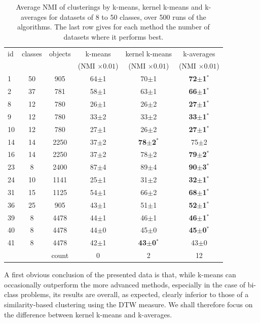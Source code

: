 \documentclass[a4paper,twoside]{article}
\begin{document}
 
 
   
\begin{table} 
\begin{center} 
\small 
 \setlength{\tabcolsep}{1em}
 \renewcommand{\arraystretch}{1.2}
\begin{tabular}{lccccc} 
id & classes & objects & k-means & kernel k-means & k-averages \\ 
&  &  & (NMI $\times 0.01$) & (NMI $\times 0.01$) & (NMI $\times 0.01$) \\ 
\hline 
 1 & 50 &  905 & 64$\pm$1 & 70$\pm$1 & \textbf{72$\pm$1$^*$} \\ 
 2 & 37 &  781 & 58$\pm$1 & 63$\pm$1 & \textbf{66$\pm$1$^*$} \\ 
 8 & 12 &  780 & 26$\pm$1 & 26$\pm$2 & \textbf{27$\pm$1$^*$} \\ 
 9 & 12 &  780 & 33$\pm$2 & 33$\pm$2 & \textbf{33$\pm$1$^*$} \\ 
10 & 12 &  780 & 27$\pm$1 & 26$\pm$2 & \textbf{27$\pm$1$^*$} \\ 
14 & 14 & 2250 & 37$\pm$2 & \textbf{78$\pm$2$^*$} & 75$\pm$2 \\ 
16 & 14 & 2250 & 37$\pm$2 & 78$\pm$2 & \textbf{79$\pm$2$^*$} \\ 
23 &  8 & 2400 & 87$\pm$4 & 89$\pm$4 & \textbf{90$\pm$3$^*$} \\ 
24 & 10 & 1141 & 25$\pm$1 & 31$\pm$2 & \textbf{32$\pm$1$^*$} \\ 
31 & 15 & 1125 & 54$\pm$1 & 66$\pm$2 & \textbf{68$\pm$1$^*$} \\ 
36 & 25 &  905 & 43$\pm$1 & 51$\pm$1 & \textbf{52$\pm$1$^*$} \\ 
39 &  8 & 4478 & 44$\pm$1 & 46$\pm$1 & \textbf{46$\pm$1$^*$} \\ 
40 &  8 & 4478 & 44$\pm$0 & 45$\pm$0 & \textbf{45$\pm$0$^*$} \\ 
41 &  8 & 4478 & 42$\pm$1 & \textbf{43$\pm$0$^*$} & 43$\pm$0 \\ 
\hline 
 &  & count & 0 & 2 & 12 \\ 
\end{tabular} 
\end{center} 
\caption{Average NMI of clusterings by k-means, kernel k-means and k-averages for datasets of 8 to 50 classes, over 500 runs of the algorithms. The last row gives for each method the number of datasets where it performs best.}
\label{tab:results-8}
\end{table} 
 
A first obvious conclusion of the presented data is that, while k-means can occasionally outperform the more advanced methods, especially in the case of bi-class problems, its results are overall, as expected, clearly inferior to those of a similarity-based clustering using the DTW measure. We shall therefore focus on the difference between kernel k-means and k-averages.
\end{document}
